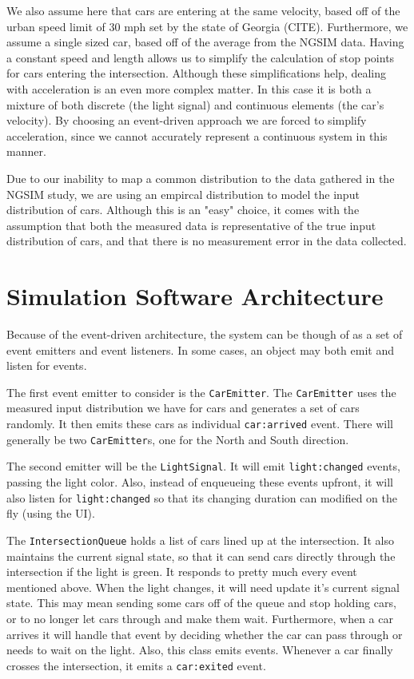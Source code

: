 \documentclass[a4paper,12pt]{article}
\begin{document}
We also assume here that cars are entering at the same velocity, based off of the urban speed limit of 30 mph set by
the state of Georgia (CITE). Furthermore, we assume a single sized car, based off of the average from the NGSIM data.
Having a constant speed and length allows us to simplify the calculation of stop points for cars entering the
intersection. Although these simplifications help, dealing with acceleration is an even more complex matter. In this
case it is both a mixture of both discrete (the light signal) and continuous elements (the car's velocity). By choosing
an event-driven approach we are forced to simplify acceleration, since we cannot accurately represent a continuous
system in this manner.

Due to our inability to map a common distribution to the data gathered in the NGSIM study, we are using an empircal
distribution to model the input distribution of cars. Although this is an "easy" choice, it comes with the assumption
that both the measured data is representative of the true input distribution of cars, and that there is no measurement
error in the data collected. 

\section{Simulation Software Architecture}
Because of the event-driven architecture, the system can be though of as a set of event emitters and event listeners.
In some cases, an object may both emit and listen for events.

The first event emitter to consider is the \texttt{CarEmitter}. The \texttt{CarEmitter} uses the measured input
distribution we have for cars and generates a set of cars randomly. It then emits these cars as individual
\texttt{car:arrived} event. There will generally be two \texttt{CarEmitter}s, one for the North and South direction.

The second emitter will be the \texttt{LightSignal}. It will emit \texttt{light:changed} events, passing the light color.
Also, instead of enqueueing these events upfront, it will also listen for \texttt{light:changed} so that its
changing duration can modified on the fly (using the UI).

The \texttt{IntersectionQueue} holds a list of cars lined up at the intersection. It also maintains the
current signal state, so that it can send cars directly through the intersection if the light is green. It responds
to pretty much every event mentioned above. When the light changes, it will need update it's current signal state.
This may mean sending some cars off of the queue and stop holding cars, or to no longer let cars through and make them
wait. Furthermore, when a car arrives it will handle that event by deciding whether the car can pass through or needs
to wait on the light. Also, this class emits events. Whenever a car finally crosses the intersection, it emits
a \texttt{car:exited} event.
\end{document}
